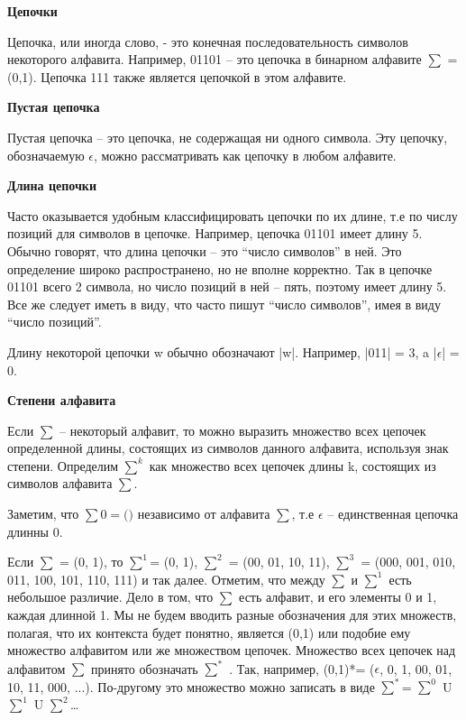 \begin{center}{\bfseries Цепочки}
\end{center}

\begin{opr}
  Цепочка, или иногда слово, - это конечная последовательность символов некоторого алфавита. Например, 01101 – это цепочка в бинарном алфавите $\sum$ = (0,1). Цепочка 111 также является цепочкой в этом алфавите.  
\end{opr}

\begin{center}{\bfseries Пустая цепочка}
\end{center}

\begin{opr}
  Пустая цепочка – это цепочка, не содержащая ни одного символа. Эту цепочку, обозначаемую  $\epsilon$, можно рассматривать как  цепочку в любом алфавите.  
\end{opr}

\begin{center}{\bfseries Длина цепочки}
\end{center}

Часто оказывается удобным классифицировать цепочки по их длине, т.е по числу позиций для символов в цепочке. Например, цепочка 01101 имеет длину 5. Обычно говорят, что длина цепочки – это “число символов” в ней. Это определение широко распространено, но не вполне корректно. Так в цепочке 01101 всего 2 символа, но число позиций в ней – пять, поэтому имеет длину 5. Все же следует иметь в виду, что часто пишут “число символов”, имея в виду “число позиций”.

Длину некоторой цепочки w обычно обозначают |w|. Например, |011| = 3, a |$\epsilon$| = 0.

\begin{center}{\bfseries Степени алфавита}
\end{center}

Если $\sum$ – некоторый алфавит, то можно выразить множество всех цепочек определенной длины, состоящих из символов данного алфавита, используя знак степени. Определим $\sum^{k} $ как множество всех цепочек длины k, состоящих из символов алфавита $\sum$. 

\begin{example}
  Заметим, что $\sum0= ($\epsilon$)$ независимо от алфавита $\sum$, т.е $\epsilon$ – единственная цепочка длинны 0. 
\end{example}

Если $\sum$ = (0, 1), то $\sum^{1}$= (0, 1), $\sum^{2}$ = (00, 01, 10, 11), $\sum^{3}$ = (000, 001, 010, 011, 100, 101, 110, 111) и так далее. Отметим, что между $\sum$ и $\sum^{1}$ есть небольшое различие. Дело в том, что $\sum$ есть алфавит, и его элементы 0 и 1, каждая длинной 1. Мы не будем вводить разные обозначения для этих множеств, полагая, что их контекста будет понятно, является (0,1) или подобие ему множество алфавитом или же множеством цепочек. Множество всех цепочек над алфавитом $\sum$ принято обозначать $\sum^{*}$ . Так, например, (0,1)*= ($\epsilon$, 0, 1, 00, 01, 10, 11, 000, ...). По-другому это множество можно записать в виде $\sum^{*}$= $\sum^{0}$ U $\sum^{1}$ U $\sum^{2}$…

